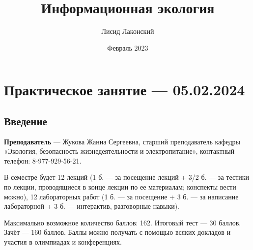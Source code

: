\documentclass{article}
\title{Информационная экология}
\author{Лисид Лаконский}
\date{Февраль 2023}
\begin{document}
\raggedright

\maketitle

\tableofcontents
\pagebreak

\section{Практическое занятие — 05.02.2024}

\subsection{Введение}

\textbf{Преподаватель} — Жукова Жанна Сергеевна, старший преподаватель кафедры «Экология, безопасность жизнедеятельности и электропитание», контактный телефон: 8-977-929-56-21.

В семестре будет 12 лекций (1 б. — за посещение лекций + 3/2 б. — за тестики по лекции, проводящиеся в конце лекции по ее материалам; конспекты вести можно), 12 лабораторных работ (1 б. — за посещение + 3 б. — за написание лабораторной + 3 б. — интерактив, разговорные навыки).

Максимально возможное количество баллов: 162. Итоговый тест — 30 баллов. Зачёт — 160 баллов. Баллы можно получать с помощью всяких докладов и участия в олимпиадах и конференциях.
\end{document}
